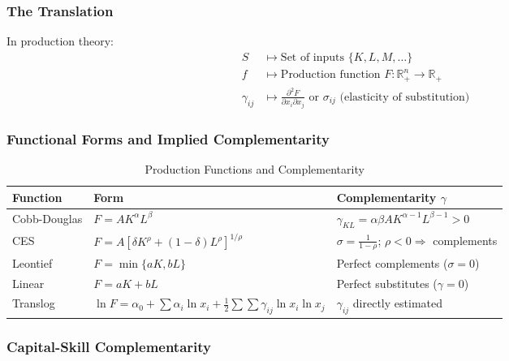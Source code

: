 \subsubsection{The Translation}

\begin{axiom}
In production theory:
\begin{align}
S &\mapsto \text{Set of inputs } \{K, L, M, \ldots\} \\
f &\mapsto \text{Production function } F: \mathbb{R}^n_+ \to \mathbb{R}_+ \\
\gamma_{ij} &\mapsto \frac{\partial^2 F}{\partial x_i \partial x_j} \text{ or } \sigma_{ij} \text{ (elasticity of substitution)}
\end{align}
\end{axiom}

\subsubsection{Functional Forms and Implied Complementarity}

\begin{table}[h]
\centering
\caption{Production Functions and Complementarity}
\label{tab:production-gamma}
\renewcommand{\arraystretch}{1.3}
\begin{tabular}{@{}lll@{}}
\toprule
\textbf{Function} & \textbf{Form} & \textbf{Complementarity $\gamma$} \\
\midrule
Cobb-Douglas & $F = A K^\alpha L^\beta$ & $\gamma_{KL} = \alpha\beta A K^{\alpha-1} L^{\beta-1} > 0$ \\
CES & $F = A[\delta K^\rho + (1-\delta)L^\rho]^{1/\rho}$ & $\sigma = \frac{1}{1-\rho}$; $\rho < 0 \Rightarrow$ complements \\
Leontief & $F = \min\{aK, bL\}$ & Perfect complements ($\sigma = 0$) \\
Linear & $F = aK + bL$ & Perfect substitutes ($\gamma = 0$) \\
Translog & $\ln F = \alpha_0 + \sum \alpha_i \ln x_i + \frac{1}{2}\sum\sum \gamma_{ij} \ln x_i \ln x_j$ & $\gamma_{ij}$ directly estimated \\
\bottomrule
\end{tabular}
\end{table}

\subsubsection{Capital-Skill Complementarity}

